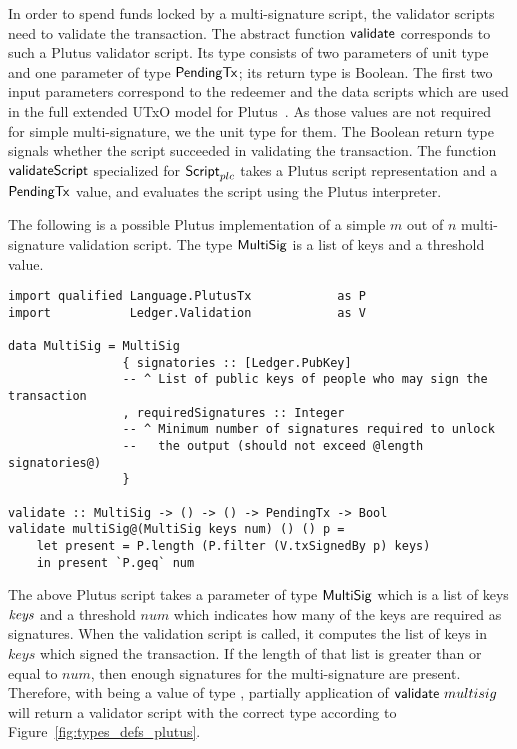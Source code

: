 \documentclass[11pt,a4paper,dvipsnames]{article}
\newcommand{\Script}{\type{Script}}
\newcommand{\ScriptPlutus}{\Script_{plc}}
\newcommand{\PendingTx}{\type{PendingTx}}
\theoremstyle{definition}
\begin{document}
In order to spend funds locked by a multi-signature script, the validator
scripts need to validate the transaction. The abstract function $\mathsf{validate}$
corresponds to such a Plutus validator script. Its type consists of two
parameters of unit type and one parameter of type $\PendingTx$; its return type
is Boolean. The first two input parameters correspond to the redeemer and the
data scripts which are used in the full extended UTxO model for
Plutus~\cite{plutus_eutxo}. As those values are not required for simple
multi-signature, we the unit type for them. The Boolean return type signals
whether the script succeeded in validating the transaction. The function
$\mathsf{validateScript}$ specialized for $\ScriptPlutus$ takes a Plutus script
representation and a $\PendingTx$ value, and evaluates the script using the
Plutus interpreter.

The following is a possible Plutus implementation of a simple $m$ out of $n$
multi-signature validation script. The type $\mathsf{MultiSig}$ is a list of keys
and a threshold value.

\begin{verbatim}
import qualified Language.PlutusTx            as P
import           Ledger.Validation            as V

data MultiSig = MultiSig
                { signatories :: [Ledger.PubKey]
                -- ^ List of public keys of people who may sign the transaction
                , requiredSignatures :: Integer
                -- ^ Minimum number of signatures required to unlock
                --   the output (should not exceed @length signatories@)
                }

validate :: MultiSig -> () -> () -> PendingTx -> Bool
validate multiSig@(MultiSig keys num) () () p =
    let present = P.length (P.filter (V.txSignedBy p) keys)
    in present `P.geq` num
\end{verbatim}

The above Plutus script takes a parameter  of type
$\mathsf{MultiSig}$ which is a list of keys $\mathit{keys}$ and a threshold $num$
which indicates how many of the keys are required as signatures. When the
validation script is called, it computes the list of keys in $keys$ which signed
the transaction. If the length of that list is greater than or equal to $num$,
then enough signatures for the multi-signature are present. Therefore, with
 being a value of type , partially application of
$\mathsf{validate}~multisig$ will return a validator script with the correct type
according to Figure~\ref{fig:types_defs_plutus}.
\end{document}

